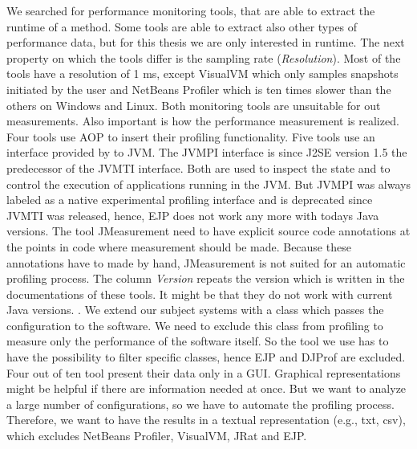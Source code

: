 We searched for performance monitoring tools, that are able to extract the runtime of a method. Some tools are able to extract also other types of performance data, but for this thesis we are only interested in runtime. The next property on which the tools differ is the sampling rate (\textit{Resolution}). Most of the tools have a resolution of 1 ms, except VisualVM which only samples snapshots initiated by the user and NetBeans Profiler which is ten times slower than the others on Windows and Linux. Both monitoring tools are unsuitable for out measurements. Also important is how the performance measurement is realized. 
Four tools use \ac{AOP} to insert their profiling functionality. Five tools use an interface provided by to \ac{JVM}. The JVMPI interface is since J2SE version 1.5 the predecessor of the JVMTI interface. Both are used to inspect the state and to control the execution of applications running in the \ac{JVM}. But JVMPI was always labeled as a native experimental profiling interface and is deprecated since JVMTI was released, hence, EJP does not work any more with todays Java versions. The tool JMeasurement need to have explicit source code annotations at the points in code where measurement should be made. Because these annotations have to made by hand, JMeasurement is not suited for an automatic profiling process. 
The column \textit{Version} repeats the version which is written in the documentations of these tools. It might be that they do not work with current Java versions. . 
We extend our subject systems with a class which passes the configuration to the software. We need to exclude this class from profiling to measure only the performance of the software itself. So the tool we use has to have the possibility to filter specific classes, hence EJP and DJProf are excluded.
Four out of ten tool present their data only in a \ac{GUI}. Graphical representations might be helpful if there are information needed at once. But we want to analyze a large number of configurations, so we have to automate the profiling process. Therefore, we want to have the results in a textual representation (e.g., txt, csv), which excludes NetBeans Profiler, VisualVM, JRat and EJP.








